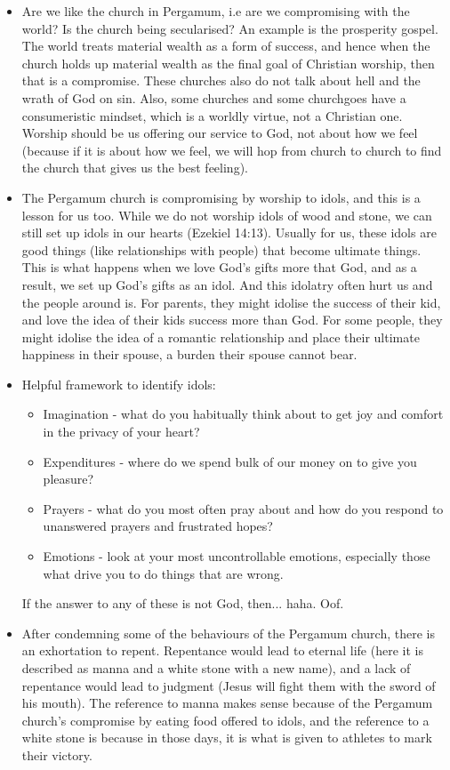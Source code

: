\begin{itemize}
{  says that Pergamum was given to pagan worship more than all of the cities
  of Asia minor.}
  \item{Are we like the church in Pergamum, i.e are we compromising with the
  world?  Is the church being secularised?  An example is the prosperity
  gospel.  The world treats material wealth as a form of success, and hence
  when the church holds up material wealth as the final goal of Christian
  worship, then that is a compromise.  These churches also do not talk about
  hell and the wrath of God on sin.  Also, some churches and some churchgoes
  have a consumeristic mindset, which is a worldly virtue, not a Christian
  one.  Worship should be us offering our service to God, not about how we feel (because if it is about how we feel, we will hop from church to church to find the church that gives us the best feeling).}
  \item{The Pergamum church is compromising by worship to idols, and this is
  a lesson for us too.  While we do not worship idols of wood and stone, we
  can still set up idols in our hearts (Ezekiel 14:13).  Usually for us,
  these idols are good things (like relationships with people) that become
  ultimate things.  This is what happens when we love God's gifts more that
  God, and as a result, we set up God's gifts as an idol. And this idolatry often hurt us and the people around is.  For parents, they
  might idolise the success of their kid, and love the idea of their kids
  success more than God.  For some people, they might idolise the idea of a
  romantic relationship and place their ultimate happiness in their spouse, a
  burden their spouse cannot bear.  }
  \item{Helpful framework to identify idols: 
  \begin{itemize}
    \item{Imagination - what do you habitually think about to get joy and comfort in the privacy of your heart?}
    \item{Expenditures - where do we spend bulk of our money on to give you pleasure?}
    \item{Prayers - what do you most often pray about and how do you respond to unanswered prayers and frustrated hopes?}
    \item{Emotions - look at your most uncontrollable emotions, especially those what drive you to do things that are wrong.}
  \end{itemize}
  If the answer to any of these is not God, then...  haha.  Oof.}
  \item{After condemning some of the behaviours of the Pergamum church, there
  is an exhortation to repent.  Repentance would lead to eternal life (here
  it is described as manna and a white stone with a new name), and a lack of
  repentance would lead to judgment (Jesus will fight them with the sword of
  his mouth).  The reference to manna makes sense because of the Pergamum
  church's compromise by eating food offered to idols, and the reference to a
  white stone is because in those days, it is what is given to athletes to
  mark their victory.}
\end{itemize}